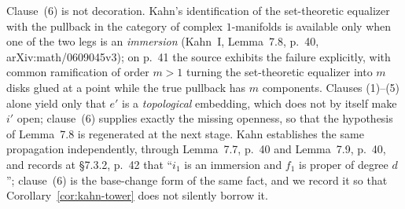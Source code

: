 \begin{remark}
\label{rem:openness-regenerates-immersion}
Clause~(6) is not decoration.  Kahn's identification of the
set-theoretic equalizer with the pullback in the category of complex
\(1\)-manifolds is available only when one of the two legs is an
\emph{immersion} (Kahn~I, Lemma~7.8, p.~40, arXiv:math/0609045v3); on
p.~41 the source exhibits the failure explicitly, with common
ramification of order \(m>1\) turning the set-theoretic equalizer into
\(m\) disks glued at a point while the true pullback has \(m\)
components.  Clauses (1)--(5) alone yield only that \(e'\) is a
\emph{topological} embedding, which does not by itself make \(i'\)
open; clause~(6) supplies exactly the missing openness, so that the
hypothesis of Lemma~7.8 is regenerated at the next stage.  Kahn
establishes the same propagation independently, through Lemma~7.7,
p.~40 and Lemma~7.9, p.~40, and records at \S7.3.2, p.~42 that
``\(i_1\) is an immersion and \(f_1\) is proper of degree \(d\)'';
clause~(6) is the base-change form of the same fact, and we record it
so that Corollary~\ref{cor:kahn-tower} does not silently borrow it.
\end{remark}